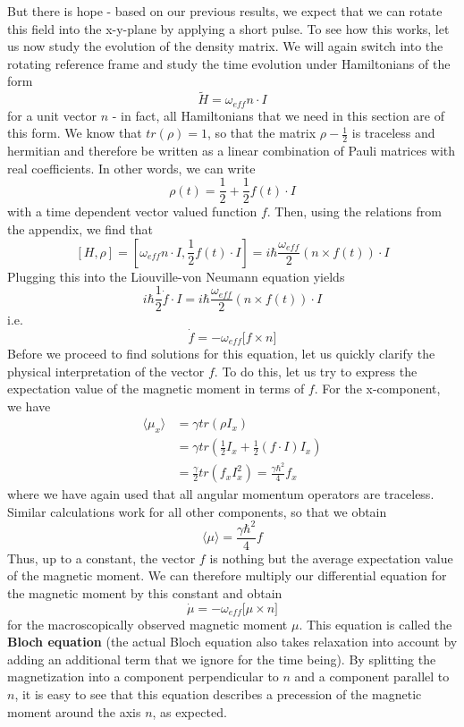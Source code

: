 \documentclass[a4paper, draft]{article}
\theoremstyle{own}
\theoremstyle{remark}
\begin{document}
But there is hope - based on our previous results, we expect that we can rotate this field into the x-y-plane by applying a short pulse. To see how this works, let us now study the evolution of the density matrix. We will again switch into the rotating reference frame and study the time evolution under Hamiltonians of the form
$$
\widetilde{H} =  \omega_{eff} n \cdot I
$$
for a unit vector $n$ - in fact, all Hamiltonians that we need in this section are of this form. We know that $tr(\rho) = 1$, so that the matrix $\rho - \frac{1}{2}$ is traceless and hermitian and therefore be written as a linear combination of Pauli matrices with real coefficients. In other words, we can write
$$
\rho(t) = \frac{1}{2}  + \frac{1}{2} f(t) \cdot I 
$$
with a time dependent vector valued function $f$. Then, using the relations from the appendix, we find that
$$
[H,\rho] = [ \omega_{eff} n \cdot I, \frac{1}{2} f(t) \cdot I]
=  i \hbar \frac{\omega_{eff}}{2} (n \times f(t)) \cdot I
$$
Plugging this into the Liouville-von Neumann equation yields
$$
i \hbar \frac{1}{2} \dot{f} \cdot I  =  i \hbar \frac{\omega_{eff}}{2} (n \times f(t)) \cdot I
$$
i.e.
$$
\dot{f} =  -\omega_{eff} \big[  f \times n \big] 
$$
Before we proceed to find solutions for this equation, let us quickly clarify the physical interpretation of the vector $f$. To do this, let us try to express the expectation value of the magnetic moment in terms of $f$. For the x-component, we have
\begin{align*}
\langle \mu_x \rangle &= \gamma tr(\rho I_x) \\ 
&= \gamma tr(\frac{1}{2} I_x + \frac{1}{2} (f \cdot I) I_x  ) \\
&= \frac{\gamma}{2} tr(f_x I_x^2) = \frac{\gamma \hbar^2}{4} f_x
\end{align*}
where we have again used that all angular momentum operators are traceless. Similar calculations work for all other components, so that we obtain
$$
\langle \mu \rangle = \frac{\gamma \hbar^2}{4} f
$$
Thus, up to a constant, the vector $f$ is nothing but the average expectation value of the magnetic moment. We can therefore multiply our differential equation for the magnetic moment by this constant and obtain
$$
\dot{\mu} = -\omega_{eff} \big[ \mu \times n \big] 
$$
for the macroscopically observed magnetic moment $\mu$. This equation is called the {\bf Bloch equation} (the actual Bloch equation also takes relaxation into account by adding an additional term that we ignore for the time being). By splitting the magnetization into a component perpendicular to $n$ and a component parallel to $n$, it is easy to see that this equation describes a precession of the magnetic moment around the axis $n$, as expected.
\end{document}
